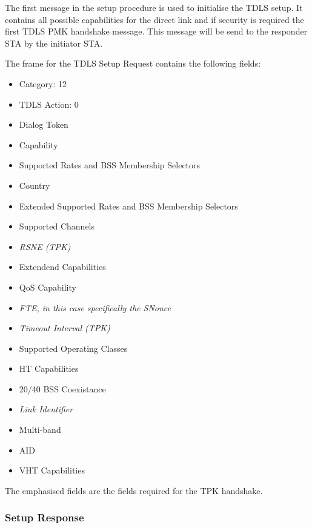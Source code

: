 The first message in the setup procedure is used to initialise the TDLS setup. It contains all possible capabilities for the direct link and if security is required the first TDLS PMK handshake message.  This message will be send to the responder STA by the initiator STA.

The frame for the TDLS Setup Request contains the following fields:

\begin{itemize}
	\item Category: 12
	\item TDLS Action: 0
	\item Dialog Token
	\item Capability
	\item Supported Rates and BSS Membership Selectors
	\item Country
	\item Extended Supported Rates and BSS Membership Selectors
	\item Supported Channels
	\item \emph{RSNE (TPK)}
	\item Extendend Capabilities
	\item QoS Capability
	\item \emph{FTE, in this case specifically the SNonce}
	\item \emph{Timeout Interval (TPK)}
	\item Supported Operating Classes
	\item HT Capabilities
	\item 20/40 BSS Coexistance
	\item \emph{Link Identifier}
	\item Multi-band
	\item AID
	\item VHT Capabilities
\end{itemize} 

The emphasised fields are the fields required for the TPK handshake.



\subsubsection{Setup Response}

